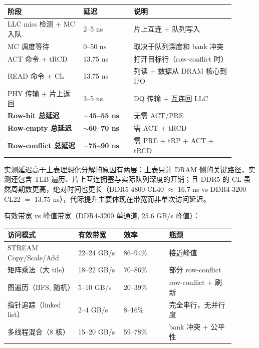 \begin{longtable}{L{0.3\linewidth}L{0.2\linewidth}L{0.4\linewidth}}
\toprule
阶段 & 延迟 & 说明 \\
\midrule
LLC miss 检测 + MC 入队 & 2--5 ns & 片上互连 + 队列写入 \\
MC 调度等待 & 0--50 ns & 取决于队列深度和 bank 冲突 \\
ACT 命令 + tRCD & 13.75 ns & 打开目标行（row-conflict 时） \\
READ 命令 + CL & 13.75 ns & 列读 + 数据从 DRAM 核心到 I/O \\
PHY 传输 + 片上返回 & 3--5 ns & DQ 传输 + 互连回 LLC \\
\midrule
\textbf{Row-hit 总延迟} & \textbf{$\sim$45--55 ns} & 无需 ACT/PRE \\
\textbf{Row-empty 总延迟} & \textbf{$\sim$60--70 ns} & 需 ACT + tRCD \\
\textbf{Row-conflict 总延迟} & \textbf{$\sim$75--90 ns} & 需 PRE + tRP + ACT + tRCD \\
\bottomrule
\end{longtable}


实测延迟高于上表理想化分解的原因有两层：上表只计 DRAM 侧的关键路径，实测还包含 TLB 遍历、片上互连拥塞与实际队列深度的开销；且 DDR5 的 CL 虽然周期数更高，绝对时间也更长（DDR5-4800 CL40 $\approx$ 16.7 ns vs DDR4-3200 CL22 $=$ 13.75 ns），代际提升主要体现在带宽而非单次访问延迟。

有效带宽 vs 峰值带宽（DDR4-3200 单通道, 25.6 GB/s 峰值）：

\begin{longtable}{L{0.28\linewidth}L{0.18\linewidth}L{0.18\linewidth}L{0.26\linewidth}}
\toprule
访问模式 & 有效带宽 & 效率 & 瓶颈 \\
\midrule
STREAM Copy/Scale/Add & 22--24 GB/s & 86--94\% & 接近峰值 \\
矩阵乘法（大 tile） & 18--22 GB/s & 70--86\% & 部分 row-conflict \\
图遍历（BFS, 随机） & 5--10 GB/s & 20--39\% & row-conflict + 刷新 \\
指针追踪（linked list） & 2--4 GB/s & 8--16\% & 完全串行，无并行度 \\
多线程混合（8 核） & 15--20 GB/s & 59--78\% & bank 冲突 + 公平性 \\
\bottomrule
\end{longtable}

